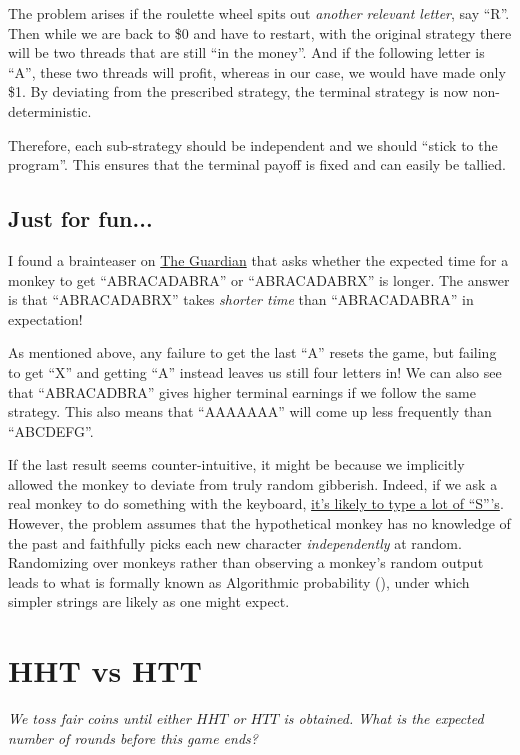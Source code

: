 \documentclass[11pt]{article}
\begin{document}
The problem arises if the roulette wheel spits out \emph{another relevant letter}, say ``R''. Then while we are back to \$0 and have to restart, with the original strategy there will be two threads that are still ``in the money''. And if the following letter is ``A'', these two threads will profit, whereas in our case, we would have made only \$1. By deviating from the prescribed strategy, the terminal strategy is now non-deterministic.

Therefore, each sub-strategy should be independent and we should ``stick to the program''. This ensures that the terminal payoff is fixed and can easily be tallied.

\subsection{Just for fun...}
I found a brainteaser on \href{https://www.theguardian.com/science/2023/mar/20/can-you-solve-it-the-infinite-monkey-theorem}{The Guardian} that asks whether the expected time for a monkey to get ``ABRACADABRA'' or ``ABRACADABRX'' is longer. The answer is that ``ABRACADABRX'' takes \emph{shorter time} than ``ABRACADABRA'' in expectation! 

As mentioned above, any failure to get the last ``A'' resets the game, but failing to get ``X'' and getting ``A'' instead leaves us still four letters in! We can also see that ``ABRACADBRA'' gives higher terminal earnings if we follow the same strategy. This also means that ``AAAAAAA'' will come up less frequently than ``ABCDEFG''.

If the last result seems counter-intuitive, it might be because we implicitly allowed the monkey to deviate from truly random gibberish. Indeed, if we ask a real monkey to do something with the keyboard, \href{https://www.bbc.co.uk/devon/news_features/2003/monkey_words.shtml}{it's likely to type a lot of ``S'''s}. However, the problem assumes that the hypothetical monkey has no knowledge of the past and faithfully picks each new character \emph{independently} at random. Randomizing over monkeys rather than observing a monkey's random output leads to what is formally known as Algorithmic probability (\cite{Hutter:2007}), under which simpler strings are likely as one might expect.

\section{HHT vs HTT}
\textit{We toss fair coins until either $HHT$ or $HTT$ is obtained. What is the expected number of rounds before this game ends?}
\end{document}
